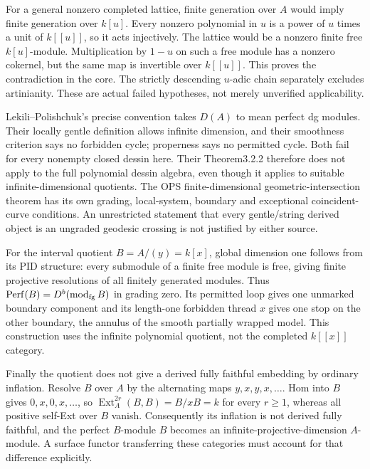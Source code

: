 For a general nonzero completed lattice, finite generation over $A$ would imply finite generation over $k[u]$. Every nonzero polynomial in $u$ is a power of $u$ times a unit of $k[[u]]$, so it acts injectively. The lattice would be a nonzero finite free $k[u]$-module. Multiplication by $1-u$ on such a free module has a nonzero cokernel, but the same map is invertible over $k[[u]]$. This proves the contradiction in the core. The strictly descending $u$-adic chain separately excludes artinianity. These are actual failed hypotheses, not merely unverified applicability.

Lekili--Polishchuk's precise convention takes $D(A)$ to mean perfect dg modules. Their locally gentle definition allows infinite dimension, and their smoothness criterion says no forbidden cycle; properness says no permitted cycle. Both fail for every nonempty closed dessin here. Their Theorem3.2.2 therefore does not apply to the full polynomial dessin algebra, even though it applies to suitable infinite-dimensional quotients. The OPS finite-dimensional geometric-intersection theorem has its own grading, local-system, boundary and exceptional coincident-curve conditions. An unrestricted statement that every gentle/string derived object is an ungraded geodesic crossing is not justified by either source.

For the interval quotient $B=A/(y)=k[x]$, global dimension one follows from its PID structure: every submodule of a finite free module is free, giving finite projective resolutions of all finitely generated modules. Thus $\operatorname{Perf}(B)=D^b(\operatorname{mod}_{\rm fg}B)$ in grading zero. Its permitted loop gives one unmarked boundary component and its length-one forbidden thread $x$ gives one stop on the other boundary, the annulus of the smooth partially wrapped model. This construction uses the infinite polynomial quotient, not the completed $k[[x]]$ category.

Finally the quotient does not give a derived fully faithful embedding by ordinary inflation. Resolve $B$ over $A$ by the alternating maps $y,x,y,x,\ldots$. Hom into $B$ gives $0,x,0,x,\ldots$, so $\operatorname{Ext}_A^{2r}(B,B)=B/xB=k$ for every $r\ge1$, whereas all positive self-Ext over $B$ vanish. Consequently its inflation is not derived fully faithful, and the perfect $B$-module $B$ becomes an infinite-projective-dimension $A$-module. A surface functor transferring these categories must account for that difference explicitly.



